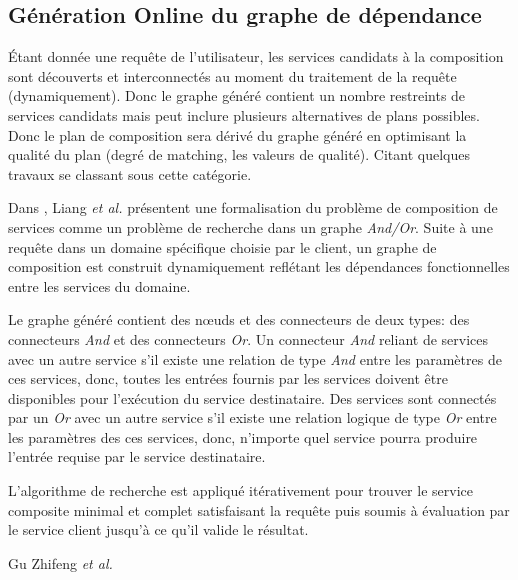   \subsection{Génération Online du graphe de dépendance}
  \label{sec:generation-online}
  Étant donnée une requête de l'utilisateur, les services candidats à
  la composition sont découverts et interconnectés au moment du
  traitement de la requête (dynamiquement). Donc le graphe généré
  contient un nombre restreints de services candidats mais peut
  inclure plusieurs alternatives de plans possibles. Donc le plan de
  composition sera dérivé du graphe généré en optimisant la qualité du
  plan (degré de matching, les valeurs de qualité). Citant quelques
  travaux se classant sous cette catégorie.


  \begin{text}
    Dans \cite{liang2005and}, Liang \textit{et al.} présentent une
    formalisation du problème de composition de services comme un
    problème de recherche dans un graphe \textit{And/Or}. Suite à une
    requête dans un domaine spécifique choisie par le client, un
    graphe de composition est construit dynamiquement reflétant les
    dépendances fonctionnelles entre les services du domaine.

    Le graphe généré contient des nœuds et des connecteurs de deux
    types: des connecteurs \textit{And} et des connecteurs
    \textit{Or}. Un connecteur \textit{And} reliant de services avec
    un autre service s'il existe une relation de type \textit{And}
    entre les paramètres de ces services, donc, toutes les entrées
    fournis par les services doivent être disponibles pour l'exécution
    du service destinataire. Des services sont connectés par un
    \textit{Or} avec un autre service s'il existe une relation logique
    de type \textit{Or} entre les paramètres des ces services, donc,
    n'importe quel service pourra produire l'entrée requise par le
    service destinataire.

    L'algorithme de recherche est appliqué itérativement pour trouver
    le service composite minimal et complet satisfaisant la requête
    puis soumis à évaluation par le service client jusqu'à ce qu'il
    valide le résultat.

    {\color{red}  %
      Gu Zhifeng \textit{et al.} \cite{gu2008automatic}
    }
  \end{text}

